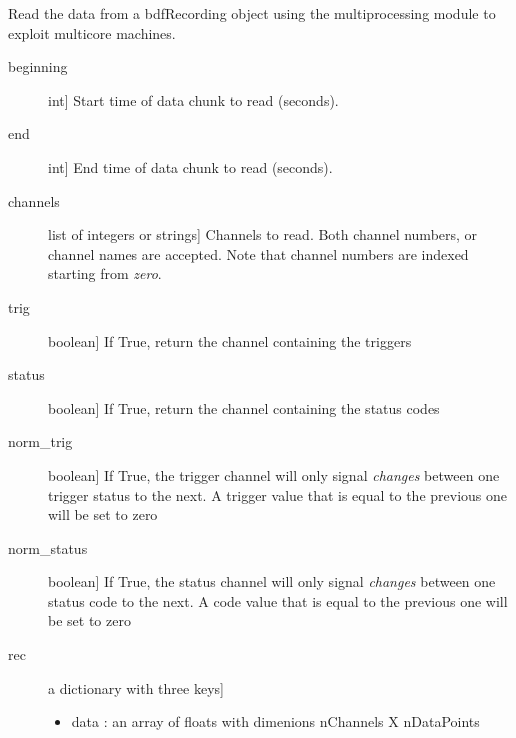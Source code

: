\documentclass[letterpaper,10pt,english]{sphinxmanual}
\begin{document}
\begin{fulllineitems}
\begin{fulllineitems}
\end{fulllineitems}


\begin{fulllineitems}
\label{intro:pybdf.bdfRecording.get_data_parallel}
Read the data from a bdfRecording object using the multiprocessing
module to exploit multicore machines.
\begin{description}
\item[{beginning}] \leavevmode{[}int{]}
Start time of data chunk to read (seconds).

\item[{end}] \leavevmode{[}int{]}
End time of data chunk to read (seconds).

\item[{channels}] \leavevmode{[}list of integers or strings{]}
Channels to read. Both channel numbers, or channel names are accepted. Note that channel numbers are indexed starting from \emph{zero}.

\item[{trig}] \leavevmode{[}boolean{]}
If True, return the channel containing the triggers

\item[{status}] \leavevmode{[}boolean{]}
If True, return the channel containing the status codes

\item[{norm\_trig}] \leavevmode{[}boolean{]}
If True, the trigger channel will only signal \emph{changes} between one trigger status to the next. A trigger value that is equal to the previous one will be set to zero

\item[{norm\_status}] \leavevmode{[}boolean{]}
If True, the status channel will only signal \emph{changes} between one status code to the next. A code value that is equal to the previous one will be set to zero

\end{description}
\begin{description}
\item[{rec}] \leavevmode{[}a dictionary with three keys{]}\begin{itemize}
\item {} 
data : an array of floats with dimenions nChannels X nDataPoints


\end{itemize}
\end{description}
\end{fulllineitems}
\end{fulllineitems}
\end{document}
